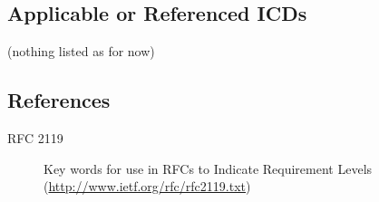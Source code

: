 \documentclass[a4paper,notitlepage]{article}
\begin{document}
\subsection{Applicable or Referenced ICDs}

(nothing listed as for now)

\subsection{References}

\begin{description}
  \item[RFC 2119] Key words for use in RFCs to Indicate Requirement Levels
    (\url{http://www.ietf.org/rfc/rfc2119.txt})
\end{description}
\end{document}
